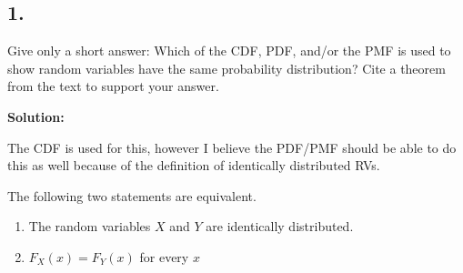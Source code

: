 \subsection*{1.}

Give only a short answer: Which of the CDF, PDF, and/or the PMF is used to show random variables have the same probability distribution? Cite a theorem from the text to support your answer.

\noindent \textbf{Solution:}

The CDF is used for this, however I believe the PDF/PMF should be able to do this as well because of the definition of identically distributed RVs.

\begin{theorem}
	The following two statements are equivalent.

	\begin{enumerate}
		\item The random variables $X$ and $Y$ are identically distributed.
		\item $F_X(x) = F_Y(x)$ for every $x$
	\end{enumerate}
\end{theorem}
